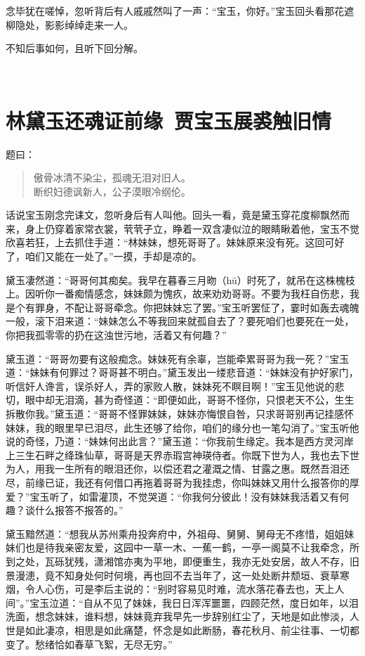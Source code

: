 \documentclass[12pt,oneside]{book}
\newenvironment{shici}{%
\begin{verse}%
\centering\large\hspace{12pt}}%
{\end{verse}}
\begin{document}
念毕犹在嗟悼，忽听背后有人戚戚然叫了一声：“宝玉，你好。”宝玉回头看那花遮柳隐处，影影绰绰走来一人。

不知后事如何，且听下回分解。

 
 
\chapter{林黛玉还魂证前缘~贾宝玉展裘触旧情}

题曰：

\begin{shici}
傲骨冰清不染尘，孤魂无泪对旧人。\\
断织妇德讽新人，公子漠眼冷纲伦。
\end{shici}


话说宝玉刚念完诔文，忽听身后有人叫他。回头一看，竟是黛玉穿花度柳飘然而来，身上仍穿着家常衣裳，茕茕孑立，睁着一双含凄似泣的眼睛瞅着他，宝玉不觉欣喜若狂，上去抓住手道：“林妹妹，想死哥哥了。妹妹原来没有死。这回可好了，咱们又能在一处了。”一摸，手却是凉的。

黛玉凄然道：“哥哥何其痴矣。我早在暮春三月昒（hū）时死了，就吊在这株槐枝上。因听你一番痴情感念，妹妹颇为愧疚，故来劝劝哥哥。不要为我枉自伤悲，我是个有罪身，不配让哥哥牵念。你把妹妹忘了罢。”宝玉听罢怔了，霎时如轰去魂魄一般，滚下泪来道：“妹妹怎么不等我回来就孤自去了？要死咱们也要死在一处，你把我孤零零的扔在这浊世污地，活着又有何趣？”

黛玉道：“哥哥勿要有这般痴念。妹妹死有余辜，岂能牵累哥哥为我一死？”宝玉道：“妹妹有何罪过？哥哥甚不明白。”黛玉发出一缕悲音道：“妹妹没有护好家门，听信奸人谗言，误杀好人，弄的家败人散，妹妹死不瞑目啊！”宝玉见他说的悲切，眼中却无泪滴，甚为奇怪道：“即便如此，哥哥不怪你，只恨老天不公，生生拆散你我。”黛玉道：“哥哥不怪罪妹妹，妹妹亦悔恨自咎，只求哥哥别再记挂感怀妹妹，我的眼里早已泪尽，此生还够了给你，咱们的缘分也一笔勾消了。”宝玉听他说的奇怪，乃道：“妹妹何出此言？”黛玉道：“你我前生缘定。我本是西方灵河岸上三生石畔之绛珠仙草，哥哥是天界赤瑕宫神瑛侍者。你既下世为人，我也去下世为人，用我一生所有的眼泪还你，以偿还君之灌溉之情、甘露之惠。既然吾泪还尽，前缘已证，我还有何借口再拖着哥哥为我挂虑，你叫妹妹又用什么报答你的厚爱？”宝玉听了，如雷灌顶，不觉哭道：“你我何分彼此！没有妹妹我活着又有何趣？谈什么报答不报答的。”

黛玉黯然道：“想我从苏州乘舟投奔府中，外祖母、舅舅、舅母无不疼惜，姐姐妹妹们也是待我亲密友爱，这园中一草一木、一蕉一鹤，一亭一阁莫不让我牵念，所到之处，瓦砾犹残，潇湘馆亦夷为平地，即便重生，我亦无处安居，故人不存，旧景漫漶，竟不知身处何时何境，再也回不去当年了，这一处处断井颓垣、衰草寒烟，令人心伤，可是李后主说的：“别时容易见时难，流水落花春去也，天上人间”。”宝玉泣道：“自从不见了妹妹，我日日浑浑噩噩，四顾茫然，度日如年，以泪洗面，想念妹妹，谁料想，妹妹竟弃我早先一步辞别红尘了，天地是如此惨淡，人世是如此凄凉，相思是如此痛楚，怀念是如此断肠，春花秋月、前尘往事、一切都变了。愁绪恰如春草飞絮，无尽无穷。”
\end{document}
